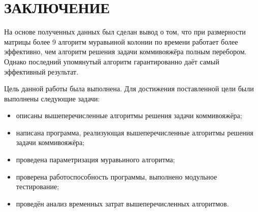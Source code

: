 \chapter*{\hfill{\centering  ЗАКЛЮЧЕНИЕ}\hfill}

На основе полученных данных был сделан вывод о том, что при размерности матрицы более 9 алгоритм муравьиной колонии по времени работает более эффективно, чем алгоритм решения задачи коммивояжёра полным перебором. Однако последний упомянутый алгоритм гарантированно даёт самый эффективный результат.

Цель данной работы была выполнена. 
Для достижения поставленной цели были выполнены следующие задачи:
\begin{itemize}[label=---]
	\item описаны вышеперечисленные алгоритмы решения задачи коммивояжёра;
	\item написана программа, реализующая вышеперечисленные алгоритмы решения задачи коммивояжёра;
	\item проведена параметризация муравьиного алгоритма;
	\item проверена работоспособность программы, выполнено модульное тестирование;
	\item проведён анализ временных затрат вышеперечисленных алгоритмов.
\end{itemize}